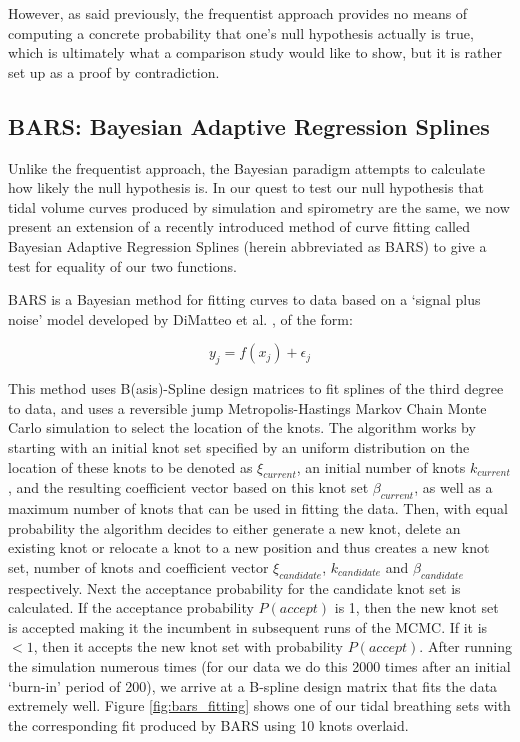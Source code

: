 However, as said previously, the frequentist approach provides no means of computing a concrete probability that one's null hypothesis actually is true, which is ultimately what a comparison study would like to show, but it is rather set up as a proof by contradiction.

\subsection{\label{sec:bars}BARS: Bayesian Adaptive Regression Splines}
Unlike the frequentist approach, the Bayesian paradigm attempts to calculate how likely the null hypothesis is. In our quest to test our null hypothesis that tidal volume curves produced by simulation and spirometry are the same, we now present an extension of a recently introduced method of curve fitting called Bayesian Adaptive Regression Splines (herein abbreviated as BARS) to give a test for equality of our two functions.

BARS is a Bayesian method for fitting curves to data based on a `signal plus noise' model developed by DiMatteo et al. \cite{dimatteo2001bayesian}, of the form:

\begin{equation}
y_j = f(x_j) + \epsilon_j
\end{equation}

This method uses B(asis)-Spline design matrices to fit splines of the third degree to data, and uses a reversible jump Metropolis-Hastings Markov Chain Monte Carlo simulation to select the location of the knots. The algorithm works by starting with an initial knot set specified by an uniform distribution on the location of these knots to be denoted as $\xi_{current}$, an initial number of knots $k_{current}$, and the resulting coefficient vector based on this knot set $\beta_{current}$, as well as a maximum number of knots that can be used in fitting the data. Then, with equal probability the algorithm decides to either generate a new knot, delete an existing knot or relocate a knot to a new position and thus creates a new knot set, number of knots and coefficient vector $\xi_{candidate}$, $k_{candidate}$ and $\beta_{candidate}$ respectively. Next the acceptance probability for the candidate knot set is calculated. If the acceptance probability $P(accept)$ is 1, then the new knot set is accepted making it the incumbent in subsequent runs of the MCMC. If it is $< 1$, then it accepts the new knot set with probability $P(accept)$. After running the simulation numerous times (for our data we do this 2000 times after an initial `burn-in' period of 200), we arrive at a B-spline design matrix that fits the data extremely well. Figure \ref{fig:bars_fitting} shows one of our tidal breathing sets with the corresponding fit produced by BARS using 10 knots overlaid.

